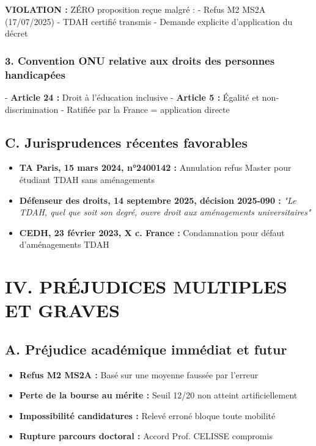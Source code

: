 \documentclass[12pt,french]{scrlttr2}
\begin{document}
\begin{letter}
\textbf{VIOLATION :} ZÉRO proposition reçue malgré :
- Refus M2 MS2A (17/07/2025)
- TDAH certifié transmis
- Demande explicite d'application du décret

\subsubsection*{3. Convention ONU relative aux droits des personnes handicapées}
- \textbf{Article 24 :} Droit à l'éducation inclusive
- \textbf{Article 5 :} Égalité et non-discrimination
- Ratifiée par la France = application directe

\subsection*{C. Jurisprudences récentes favorables}

\begin{itemize}[leftmargin=*]
\item \textbf{TA Paris, 15 mars 2024, n°2400142 :} Annulation refus Master pour étudiant TDAH sans aménagements
\item \textbf{Défenseur des droits, 14 septembre 2025, décision 2025-090 :} \textit{"Le TDAH, quel que soit son degré, ouvre droit aux aménagements universitaires"}
\item \textbf{CEDH, 23 février 2023, X c. France :} Condamnation pour défaut d'aménagements TDAH
\end{itemize}

\section*{IV. PRÉJUDICES MULTIPLES ET GRAVES}

\subsection*{A. Préjudice académique immédiat et futur}
\begin{itemize}[leftmargin=*]
\item \textbf{Refus M2 MS2A :} Basé sur une moyenne faussée par l'erreur
\item \textbf{Perte de la bourse au mérite :} Seuil 12/20 non atteint artificiellement
\item \textbf{Impossibilité candidatures :} Relevé erroné bloque toute mobilité
\item \textbf{Rupture parcours doctoral :} Accord Prof. CELISSE compromis
\end{itemize}


\end{letter}
\end{document}
